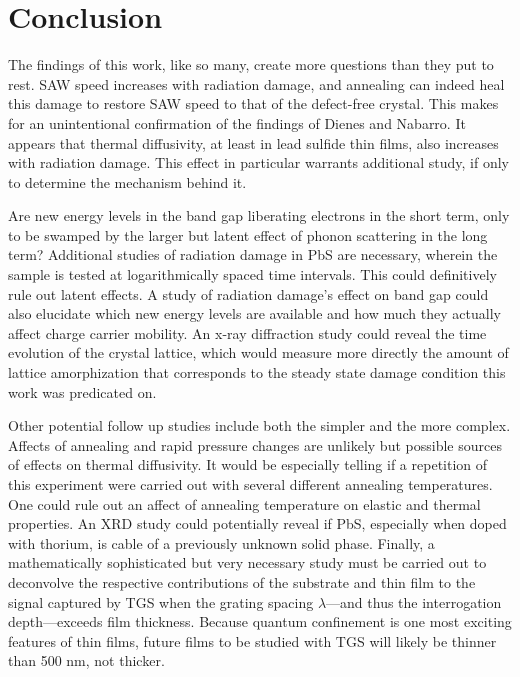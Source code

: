\chapter{Conclusion}
The findings of this work, like so many, create more questions than they put to rest. 
SAW speed increases with radiation damage, and annealing can indeed heal this damage to restore SAW speed to that of the defect-free crystal. This makes for an unintentional confirmation of the findings of Dienes and Nabarro. It appears that thermal diffusivity, at least in lead sulfide thin films, also increases with radiation damage. This effect in particular warrants additional study, if only to determine the mechanism behind it.

Are new energy levels in the band gap liberating electrons in the short term, only to be swamped by the larger but latent effect of phonon scattering in the long term? Additional studies of radiation damage in PbS are necessary, wherein the sample is tested at logarithmically spaced time intervals. This could definitively rule out latent effects. A study of radiation damage's effect on band gap could also elucidate which new energy levels are available and how much they actually affect charge carrier mobility. An x-ray diffraction study could reveal the time evolution of the crystal lattice, which would measure more directly the amount of lattice amorphization that corresponds to the steady state damage condition this work was predicated on. 

Other potential follow up studies include both the simpler and the more complex. Affects of annealing and rapid pressure changes are unlikely but possible sources of effects on thermal diffusivity. It would be especially telling if a repetition of this experiment were carried out with several different annealing temperatures. One could rule out an affect of annealing temperature on elastic and thermal properties. An XRD study could potentially reveal if PbS, especially when doped with thorium, is cable of a previously unknown solid phase. Finally, a mathematically sophisticated but very necessary study must be carried out to deconvolve the respective contributions of the substrate and thin film to the signal captured by TGS when the grating spacing $\lambda$---and thus the interrogation depth---exceeds film thickness. Because quantum confinement is one most exciting features of thin films, future films to be studied with TGS will likely be thinner than 500 nm, not thicker.








